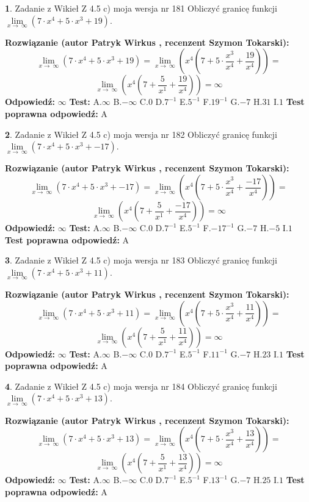 \documentclass[12pt, a4paper]{article}
\theoremstyle{definition} %
\newtheorem{zad}{}
\newcommand{\zadStart}[1]{\begin{zad}#1\newline}
\newcommand{\zadStop}{\end{zad}}
\newcommand{\rozwStart}[2]{\noindent \textbf{Rozwiązanie (autor #1 , recenzent #2): }\newline}
\newcommand{\rozwStop}{\newline}
\newcommand{\odpStart}{\noindent \textbf{Odpowiedź:}\newline}
\newcommand{\odpStop}{\newline}
\newcommand{\testStart}{\noindent \textbf{Test:}\newline}
\newcommand{\testStop}{\newline}
\newcommand{\kluczStart}{\noindent \textbf{Test poprawna odpowiedź:}\newline}
\newcommand{\kluczStop}{\newline}
\begin{document}
\zadStart{Zadanie z Wikieł Z 4.5 c) moja wersja nr 181}
Obliczyć granicę funkcji  $\lim\limits_{x\to\ \infty}(7 \cdot x^{4}+5 \cdot x^{3}+19)$.
\zadStop
\rozwStart{Patryk Wirkus}{Szymon Tokarski}
$$\lim\limits_{x\to\ \infty}(7 \cdot x^{4}+5 \cdot x^{3}+19) = \lim\limits_{x\to\ \infty}(x^{4}(7 +5 \cdot \frac{x^{3}}{x^{4}}+\frac{19}{x^{4}})) =$$ $$\lim\limits_{x\to\ \infty}(x^{4}(7 +\frac{5}{x^{1}}+\frac{19}{x^{4}})) =\infty$$
\rozwStop
\odpStart
$\infty$
\odpStop
\testStart
A.$\infty$ B.$-\infty$ C.$0$ D.$7^{-1}$ E.$5^{-1}$
F.$19^{-1}$ G.$-7$
H.$31$
I.$1$
\testStop
\kluczStart
A
\kluczStop



\zadStart{Zadanie z Wikieł Z 4.5 c) moja wersja nr 182}
Obliczyć granicę funkcji  $\lim\limits_{x\to\ \infty}(7 \cdot x^{4}+5 \cdot x^{3}+-17)$.
\zadStop
\rozwStart{Patryk Wirkus}{Szymon Tokarski}
$$\lim\limits_{x\to\ \infty}(7 \cdot x^{4}+5 \cdot x^{3}+-17) = \lim\limits_{x\to\ \infty}(x^{4}(7 +5 \cdot \frac{x^{3}}{x^{4}}+\frac{-17}{x^{4}})) =$$ $$\lim\limits_{x\to\ \infty}(x^{4}(7 +\frac{5}{x^{1}}+\frac{-17}{x^{4}})) =\infty$$
\rozwStop
\odpStart
$\infty$
\odpStop
\testStart
A.$\infty$ B.$-\infty$ C.$0$ D.$7^{-1}$ E.$5^{-1}$
F.$-17^{-1}$ G.$-7$
H.$-5$
I.$1$
\testStop
\kluczStart
A
\kluczStop



\zadStart{Zadanie z Wikieł Z 4.5 c) moja wersja nr 183}
Obliczyć granicę funkcji  $\lim\limits_{x\to\ \infty}(7 \cdot x^{4}+5 \cdot x^{3}+11)$.
\zadStop
\rozwStart{Patryk Wirkus}{Szymon Tokarski}
$$\lim\limits_{x\to\ \infty}(7 \cdot x^{4}+5 \cdot x^{3}+11) = \lim\limits_{x\to\ \infty}(x^{4}(7 +5 \cdot \frac{x^{3}}{x^{4}}+\frac{11}{x^{4}})) =$$ $$\lim\limits_{x\to\ \infty}(x^{4}(7 +\frac{5}{x^{1}}+\frac{11}{x^{4}})) =\infty$$
\rozwStop
\odpStart
$\infty$
\odpStop
\testStart
A.$\infty$ B.$-\infty$ C.$0$ D.$7^{-1}$ E.$5^{-1}$
F.$11^{-1}$ G.$-7$
H.$23$
I.$1$
\testStop
\kluczStart
A
\kluczStop



\zadStart{Zadanie z Wikieł Z 4.5 c) moja wersja nr 184}
Obliczyć granicę funkcji  $\lim\limits_{x\to\ \infty}(7 \cdot x^{4}+5 \cdot x^{3}+13)$.
\zadStop
\rozwStart{Patryk Wirkus}{Szymon Tokarski}
$$\lim\limits_{x\to\ \infty}(7 \cdot x^{4}+5 \cdot x^{3}+13) = \lim\limits_{x\to\ \infty}(x^{4}(7 +5 \cdot \frac{x^{3}}{x^{4}}+\frac{13}{x^{4}})) =$$ $$\lim\limits_{x\to\ \infty}(x^{4}(7 +\frac{5}{x^{1}}+\frac{13}{x^{4}})) =\infty$$
\rozwStop
\odpStart
$\infty$
\odpStop
\testStart
A.$\infty$ B.$-\infty$ C.$0$ D.$7^{-1}$ E.$5^{-1}$
F.$13^{-1}$ G.$-7$
H.$25$
I.$1$
\testStop
\kluczStart
A
\kluczStop
\end{document}
